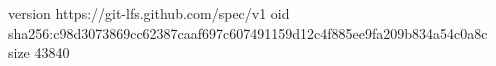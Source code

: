 version https://git-lfs.github.com/spec/v1
oid sha256:c98d3073869cc62387caaf697c607491159d12c4f885ee9fa209b834a54c0a8c
size 43840
